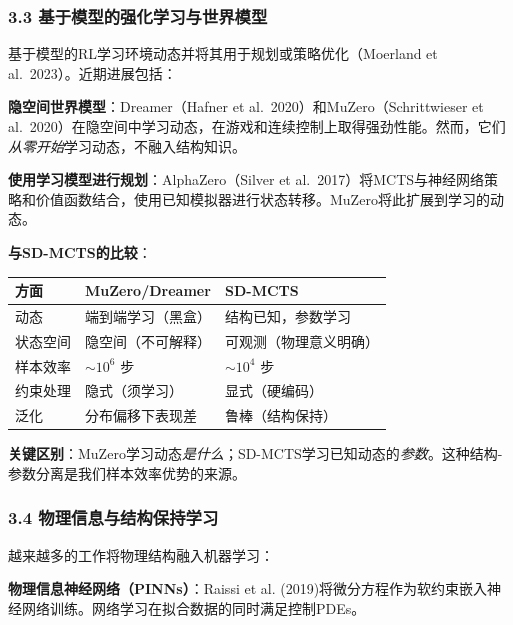 \documentclass[UTF8]{ctexart}
\begin{document}
\hypertarget{ux57faux4e8eux6a21ux578bux7684ux5f3aux5316ux5b66ux4e60ux4e0eux4e16ux754cux6a21ux578b}{%
\subsubsection{3.3
基于模型的强化学习与世界模型}\label{ux57faux4e8eux6a21ux578bux7684ux5f3aux5316ux5b66ux4e60ux4e0eux4e16ux754cux6a21ux578b}}

基于模型的RL学习环境动态并将其用于规划或策略优化（Moerland et
al.~2023）。近期进展包括：

\textbf{隐空间世界模型}：Dreamer（Hafner et
al.~2020）和MuZero（Schrittwieser et
al.~2020）在隐空间中学习动态，在游戏和连续控制上取得强劲性能。然而，它们\emph{从零开始}学习动态，不融入结构知识。

\textbf{使用学习模型进行规划}：AlphaZero（Silver et
al.~2017）将MCTS与神经网络策略和价值函数结合，使用已知模拟器进行状态转移。MuZero将此扩展到学习的动态。

\textbf{与SD-MCTS的比较}：

\begin{table}[h]
\centering
\begin{tabular}{p{3cm}p{5cm}p{6cm}}
\toprule
\textbf{方面} & \textbf{MuZero/Dreamer} & \textbf{SD-MCTS} \\
\midrule
动态 & 端到端学习（黑盒） & 结构已知，参数学习 \\
状态空间 & 隐空间（不可解释） & 可观测（物理意义明确） \\
样本效率 & \(\sim 10^6\) 步 & \(\sim 10^4\) 步 \\
约束处理 & 隐式（须学习） & 显式（硬编码） \\
泛化 & 分布偏移下表现差 & 鲁棒（结构保持） \\
\bottomrule
\end{tabular}
\end{table}

\textbf{关键区别}：MuZero学习动态\emph{是什么}；SD-MCTS学习已知动态的\emph{参数}。这种结构-参数分离是我们样本效率优势的来源。

\hypertarget{ux7269ux7406ux4fe1ux606fux4e0eux7ed3ux6784ux4fddux6301ux5b66ux4e60}{%
\subsubsection{3.4
物理信息与结构保持学习}\label{ux7269ux7406ux4fe1ux606fux4e0eux7ed3ux6784ux4fddux6301ux5b66ux4e60}}

越来越多的工作将物理结构融入机器学习：

\textbf{物理信息神经网络（PINNs）}：Raissi et al.
(2019)将微分方程作为软约束嵌入神经网络训练。网络学习在拟合数据的同时满足控制PDEs。
\end{document}

